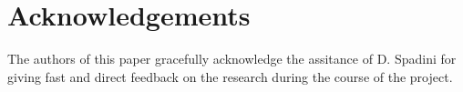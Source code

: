 \section{Acknowledgements}
The authors of this paper gracefully acknowledge the assitance of D. Spadini for giving fast and direct feedback on the research during the course of the project.